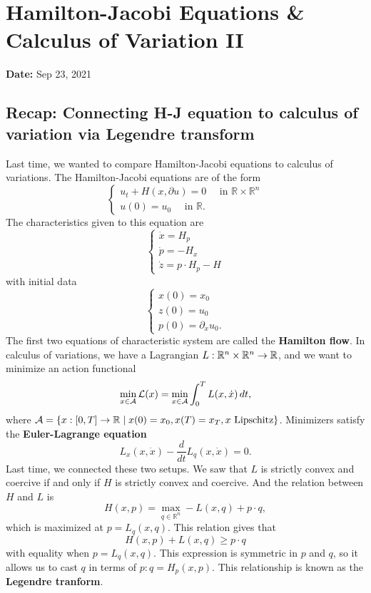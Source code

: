 \newpage
\section{Hamilton-Jacobi Equations \& Calculus of Variation II}
\textbf{Date:} Sep 23, 2021

\subsection{Recap: Connecting H-J equation to calculus of variation via Legendre transform}
Last time, we wanted to compare Hamilton-Jacobi equations to calculus of variations. The
Hamilton-Jacobi equations are of the form
\[
    \left\{\begin{array}{l}
        u_{t}+H(x, \partial u)=0 \quad \text { in } \mathbb{R} \times \mathbb{R}^{n} \\
        u(0)=u_{0} \quad \text { in } \mathbb{R} .
        \end{array}\right.
\]
The characteristics given to this equation are
\[
    \left\{\begin{array}{l}
        \dot{x}=H_{p} \\
        \dot{p}=-H_{x} \\
        \dot{z}=p \cdot H_{p}-H
        \end{array}\right.
\]
with initial data 
\[
\begin{cases}
    x(0) = x_0 \\
    z(0) = u_0\\
    p(0) = \partial_x u_0.
\end{cases}
\]
The first two equations of characteristic system are called the \textbf{Hamilton flow}. In calculus of variations, we have a Lagrangian $L:\mathbb{R}^n \times \mathbb{R}^n \to \mathbb{R}$, and we want to minimize an action functional 
\[
    \min_{x\in \mathcal{A}} \mathcal{L}(x) = \min_{x\in \mathcal{A}} \int_0^T L(x, \dot x)\, dt,
\]
where $\mathcal{A} = \{x: [0,T] \to \mathbb{R} \mid x(0)=x_0, x(T) = x_T, x \text{ Lipschitz}\}$. Minimizers satisfy the \textbf{Euler-Lagrange equation}
\[
    L_x(x,\dot x) - \frac{d}{dt}L_q(x, \dot x) =0 .
\]
Last time, we connected these two setups. We saw that $L$ is strictly convex and coercive if and only if $H$ is strictly convex and coercive. And the relation between $H$ and $L$ is 
\[
    H(x, p)=\max _{q \in \mathbb{R}^{n}}-L(x, q)+p \cdot q,
\]
which is maximized at $p=L_q(x,q)$. This relation gives that 
\[
    H(x, p)+L(x, q) \geq p \cdot q
\]
with equality when $p=L_q(x,q)$. This expression is symmetric in $p$ and $q$, so it allows us to cast $q$ in terms of $p: q= H_p(x,p)$. This relationship is known as the \textbf{Legendre tranform}.

